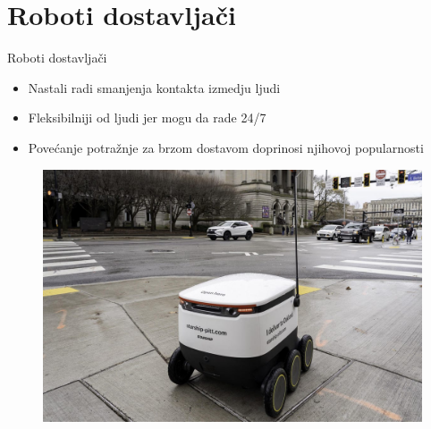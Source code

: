 \documentclass{beamer}
\begin{document}
\section{Roboti dostavljači}
\begin{frame}{Roboti dostavljači}
    \begin{itemize}
        \item Nastali radi smanjenja kontakta izmedju ljudi
        \item Fleksibilniji od ljudi jer mogu da rade 24/7
        \item Povećanje potražnje za brzom dostavom doprinosi njihovoj popularnosti
    \end{itemize}
    \begin{figure}
        \centering
        \includegraphics[scale=0.15]{DeliveryRobot.jpg}
    \end{figure}
\end{frame}
\end{document}
